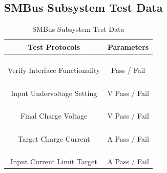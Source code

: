 \documentclass[12pt]{article}
\begin{document}
\begin{appendices}
\subsection{SMBus Subsystem Test  Data}

\begin{table}[h!]
\centering
\caption*{SMBus Subsystem Test Data}
\begin{tabular}{ | c | c | }
\hline
\textbf{Test Protocols} & \textbf{Parameters} \\
\hline
\parbox{0.5\linewidth}{\raggedright \hfill \\[-0.25 em]
Verify Interface Functionality
\hfill \\[0.1 em]} &  \parbox{0.4\linewidth}{\centering \hfill \\ [0.7 em] 
Pass \space / \space  Fail \hfill \\ [0.3 em]} \\ 
\hline
\parbox{0.5\linewidth}{\raggedright \hfill \\[-0.25 em]
Input Undervoltage Setting
\hfill \\[0.1 em]} &  \parbox{0.4\linewidth}{\raggedright \hfill \\ [0.7 em]\underline{\hspace{0.625in}} 
V  
\hspace{0.125 in}Pass \space / \space  Fail \hfill \\ [0.3 em]} \\ 
\hline
\parbox{0.5\linewidth}{\raggedright \hfill \\[-0.25 em]
Final Charge Voltage
\hfill \\[0.1 em]} &  \parbox{0.4\linewidth}{\raggedright \hfill \\ [0.7 em]\underline{\hspace{0.625in}} 
V
\hspace{0.125 in}Pass \space / \space  Fail \hfill \\ [0.3 em]} \\ 
\hline
\parbox{0.5\linewidth}{\raggedright \hfill \\[-0.25 em]
Target Charge Current
\hfill \\[0.1 em]} &  \parbox{0.4\linewidth}{\raggedright \hfill \\ [0.7 em]\underline{\hspace{0.625in}} 
A
\hspace{0.125 in}Pass \space / \space  Fail \hfill \\ [0.3 em]} \\ 
\hline
\parbox{0.5\linewidth}{\raggedright \hfill \\[-0.25 em]
Input Current Limit Target
\hfill \\[0.1 em]} &  \parbox{0.4\linewidth}{\raggedright \hfill \\ [0.7 em]\underline{\hspace{0.625in}} 
A
\hspace{0.125 in}Pass \space / \space  Fail \hfill \\ [0.3 em]} \\ 
\hline
\end{tabular}
\end{table}


\end{appendices}
\end{document}
